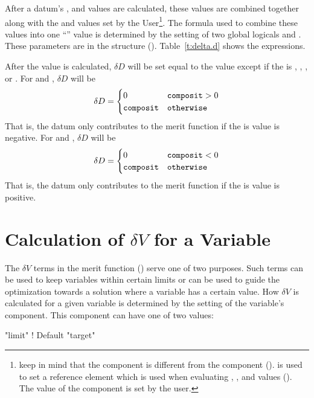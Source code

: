 After a datum's ,  and  values are calculated, these values are
combined together along with the  and  values set by the User\footnote
  {
keep in mind that the  component is different from the 
component ().  is used to set a reference element which is used
when evaluating , , and  values (). The value of
the  component is set by the user.
  }. 
The formula used to combine these values into one ``'' value is determined by the
setting of two global logicals  and . These parameters are in the
 structure (). Table~\ref{t:delta.d} shows the
expressions.

After the  value is calculated, $\delta D$ will be set equal to the  value
except if the  is , , , or .  For 
 and , $\delta D$ will be
\begin{equation}
  \delta D = 
  \begin{cases}
    0 & \tv{composit} > 0 \\
    \tv{composit} & \tv{otherwise}
  \end{cases}
\end{equation}
That is, the datum only contributes to the merit function if the  is value is negative.
For  and , $\delta D$ will be
\begin{equation}
  \delta D = 
  \begin{cases}
    0 & \tv{composit} < 0 \\
    \tv{composit} & \tv{otherwise}
  \end{cases}
\end{equation}
That is, the datum only contributes to the merit function if the  is value is positive.

\section{Calculation of $\delta V$ for a Variable}
\label{s:del.v}

The $\delta V$ terms in the merit function () serve one of two purposes. Such terms can be
used to keep variables within certain limits or can be used to guide the optimization towards a
solution where a variable has a certain value. How $\delta V$ is calculated for a given variable is
determined by the setting of the variable's  component. This component can
have one of two values:
\begin{example}
  "limit"     ! Default
  "target"
\end{example}


